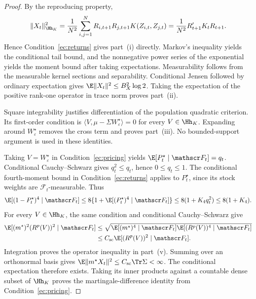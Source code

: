 \begin{proof}
By the reproducing property,
\[
\|X_t\|_{\Hh_K}^2
=
\frac1{N^2}
\sum_{i,j=1}^N
R_{i,t+1}R_{j,t+1}K(Z_{i,t},Z_{j,t})
=
\frac1{N^2}R_{t+1}'K_tR_{t+1}.
\]
Hence Condition~\ref{ec:returns} gives part~(i) directly. Markov's
inequality yields the conditional tail bound, and the nonnegative power
series of the exponential yields the moment bound after taking expectations.
Measurability follows from the measurable kernel sections and separability.
Conditional Jensen followed by ordinary expectation gives
$\E\|X_t\|^2\leq B_X^2\log2$. Taking the expectation of the positive
rank-one operator in trace norm proves part~(ii).

Square integrability justifies differentiation of the population quadratic
criterion. Its first-order condition is
$\langle V,\mu-\Sigma W^\star_\varepsilon\rangle=0$ for every $V\in\Hh_K$.
Expanding around $W^\star_\varepsilon$ removes the cross term and proves
part~(iii). No bounded-support argument is used in these identities.

Taking $V=W^\star_\varepsilon$ in Condition~\ref{ec:pricing} yields
$\E[P_t^\star\mid\mathscr F_t]=q_t$.
Conditional Cauchy--Schwarz gives $q_t^2\leq q_t$, hence $0\leq q_t\leq1$.
The conditional fourth-moment bound in Condition~\ref{ec:returns} applies
to $P_t^\star$, since its stock weights are $\mathscr F_t$-measurable.
Thus
\[
\E[(1-P_t^\star)^4\mid\mathscr F_t]
\leq8\{1+\E[(P_t^\star)^4\mid\mathscr F_t]\}
\leq8(1+K_4q_t^2)\leq8(1+K_4).
\]
For every $V\in\Hh_K$, the same condition and conditional
Cauchy--Schwarz give
\[
\begin{aligned}
\E[(m^\star)^2(R^p(V))^2\mid\mathscr F_t]
&\leq\sqrt{\E[(m^\star)^4\mid\mathscr F_t]
                 \E[(R^p(V))^4\mid\mathscr F_t]}\\
&\leq C_{\rm sc}\E[(R^p(V))^2\mid\mathscr F_t].
\end{aligned}
\]
Integration proves the operator inequality in part~(v).
Summing over an orthonormal basis gives
$\E\|m^\star X_t\|^2\leq C_{\rm sc}\Tr\Sigma<\infty$.
The conditional expectation therefore exists. Taking its inner products
against a countable dense subset of $\Hh_K$ proves the martingale-difference
identity from Condition~\ref{ec:pricing}.
\end{proof}

